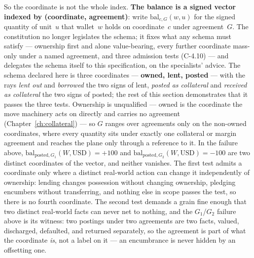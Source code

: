 \documentclass[11pt,a4paper]{article}
\begin{document}
So the coordinate is not the whole index. \textbf{The balance is a signed vector indexed
by (coordinate, agreement)}: write $\mathrm{bal}_{c,G}(w,u)$ for the signed quantity of
unit~$u$ that wallet~$w$ holds on coordinate~$c$ under agreement~$G$. The constitution no
longer legislates the schema; it fixes what any schema must satisfy --- ownership first
and alone value-bearing, every further coordinate mass-only under a named agreement, and
three admission tests (C-4.10) --- and delegates the schema itself to this specification,
on the specialists' advice. The schema declared here is three coordinates ---
\textbf{owned, lent, posted} --- with the rays \emph{lent out} and \emph{borrowed} the
two signs of lent, \emph{posted as collateral} and \emph{received as collateral} the two
signs of posted; the rest of this section demonstrates that it passes the three tests.
Ownership is unqualified --- owned is the coordinate the move machinery acts on directly
and carries no agreement (Chapter~\ref{ch:collateral}) --- so $G$ ranges over agreements
only on the non-owned coordinates, where every quantity sits under exactly one collateral
or margin agreement and reaches the plane only through a reference to it. In the failure
above, $\mathrm{bal}_{\text{posted},G_1}(W,\text{USD})=+100$ and
$\mathrm{bal}_{\text{posted},G_2}(W,\text{USD})=-100$ are two distinct coordinates of the
vector, and neither vanishes. The first test admits a coordinate only where a distinct
real-world action can change it independently of ownership: lending changes possession
without changing ownership, pledging encumbers without transferring, and nothing else in
scope passes the test, so there is no fourth coordinate. The second test demands a grain
fine enough that two distinct real-world facts can never net to nothing, and the
$G_1$/$G_2$ failure above is its witness: two postings under two agreements are two
facts, valued, discharged, defaulted, and returned separately, so the agreement is part
of what the coordinate \emph{is}, not a label on it --- an encumbrance is never hidden by
an offsetting one.
\end{document}
